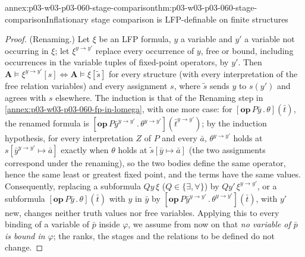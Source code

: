 \begin{annexitem}{annex:p03-w03-p03-060-stage-comparison}{thm:p03-w03-p03-060-stage-comparison}{Inflationary stage comparison is LFP-definable on finite structures}
\begin{proof}
(Renaming.) Let \(\xi\) be an LFP formula, \(y\) a variable and \(y'\) a
variable not occurring in \(\xi\); let \(\xi^{y\to y'}\) replace every
occurrence of \(y\), free or bound, including occurrences in the variable
tuples of fixed-point operators, by \(y'\). Then
\(\mathbf A\models\xi^{y\to y'}[s]\iff\mathbf A\models\xi[\tilde s]\) for
every structure (with every interpretation of the free relation variables)
and every assignment \(s\), where \(\tilde s\) sends \(y\) to \(s(y')\) and
agrees with \(s\) elsewhere. The induction is that of the Renaming step in
\cref{annex:p03-w03-p03-060-fp-in-lomega}, with one more case: for
\([\mathbf{op}\,P\bar y\,.\,\theta](\bar t)\), the renamed formula is
\([\mathbf{op}\,P\bar y^{y\to y'}\,.\,\theta^{y\to y'}](\bar t^{y\to y'})\);
by the induction hypothesis, for every interpretation \(Z\) of \(P\) and
every \(\bar a\), \(\theta^{y\to y'}\) holds at
\(s[\bar y^{y\to y'}\mapsto\bar a]\) exactly when \(\theta\) holds at
\(\tilde s[\bar y\mapsto\bar a]\) (the two assignments correspond under the
renaming), so the two bodies define the same operator, hence the same least
or greatest fixed point, and the terms have the same values. Consequently,
replacing a subformula \(Qy\,\xi\) (\(Q\in\{\exists,\forall\}\)) by
\(Qy'\,\xi^{y\to y'}\), or a subformula
\([\mathbf{op}\,P\bar y\,.\,\theta](\bar t)\) with \(y\) in \(\bar y\) by
\([\mathbf{op}\,P\bar y^{y\to y'}\,.\,\theta^{y\to y'}](\bar t)\), with
\(y'\) new, changes neither truth values nor free variables. Applying this
to every binding of a variable of \(\bar p\) inside \(\varphi\), we assume
from now on that \emph{no variable of \(\bar p\) is bound in \(\varphi\)};
the ranks, the stages and the relations to be defined do not change.


\end{proof}
\end{annexitem}
